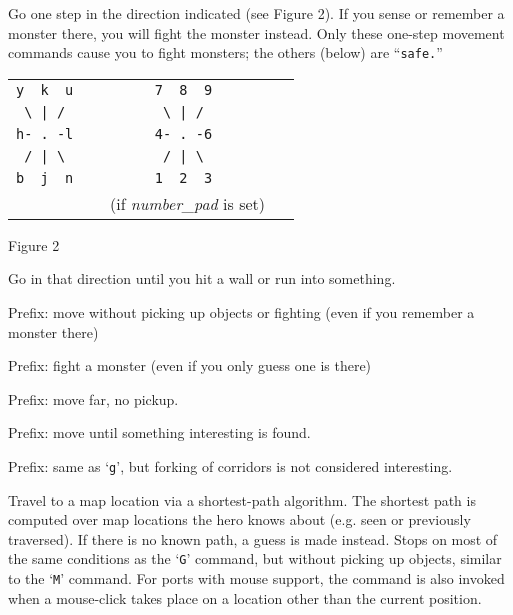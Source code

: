 \item[\tb{[yuhjklbn]}]
Go one step in the direction indicated (see Figure 2).  If you sense
or remember
a monster there, you will fight the monster instead.  Only these
one-step movement commands cause you to fight monsters; the others
(below) are ``{\tt safe.}''
\begin{center}
\begin{tabular}{cc}
\verb+y  k  u+ & \verb+        7  8  9         +\\
\verb+ \ | / + & \verb+         \ | /          +\\
\verb+h- . -l+ & \verb+        4- . -6         +\\
\verb+ / | \ + & \verb+         / | \          +\\
\verb+b  j  n+ & \verb+        1  2  3         +\\
               & (if {\it number\_pad\/} is set)
\end{tabular}
\end{center}
\begin{center}
Figure 2
\end{center}


\item[\tb{[YUHJKLBN]}]
Go in that direction until you hit a wall or run into something.

\item[\tb{{\rm m}[{\rm yuhjklbn}]}]
Prefix:  move without picking up objects or fighting (even if you remember
a monster there)

\item[\tb{{\rm F}[{\rm yuhjklbn}]}]
Prefix:  fight a monster (even if you only guess one is there)

\item[\tb{{\rm M}[{\rm yuhjklbn}]}]
Prefix:  move far, no pickup.

\item[\tb{{\rm g}[{\rm yuhjklbn}]}]
Prefix:  move until something interesting is found.

\item[\tb{{\rm G}[{\rm yuhjklbn}] {\rm or} <{\rm CONTROL}->[{\rm yuhjklbn}]}]
Prefix:  same as `{\tt g}', but forking of corridors is not considered interesting.

\item[\tb{_}]
Travel to a map location via a shortest-path algorithm.  The shortest path
is computed over map locations the hero knows about (e.g. seen or
previously traversed).  If there is no known path, a guess is made instead.
Stops on most of
the same conditions as the `{\tt G}' command, but without picking up
objects, similar to the `{\tt M}' command.  For ports with mouse 
support, the command is also invoked when a mouse-click takes place on a 
location other than the current position.

